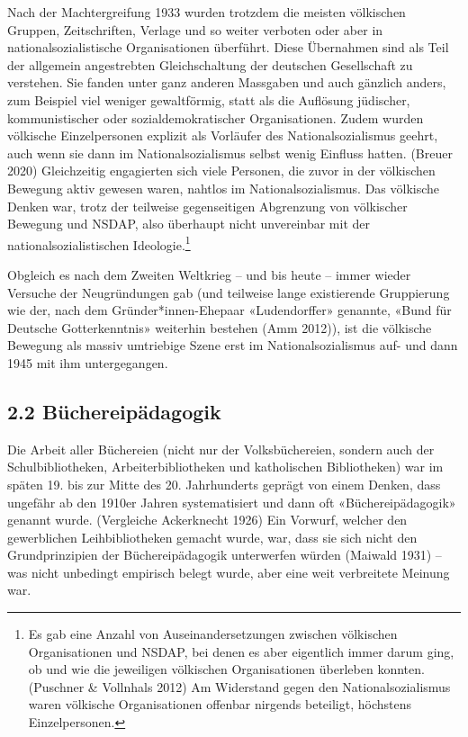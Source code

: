 \documentclass[a4paper,
fontsize=11pt,
oneside,
numbers=noperiodatend,
parskip=half-,
bibliography=totoc,
final
]{scrartcl}
\begin{document}
Nach der Machtergreifung 1933 wurden trotzdem die meisten völkischen
Gruppen, Zeitschriften, Verlage und so weiter verboten oder aber in
nationalsozialistische Organisationen überführt. Diese Übernahmen sind
als Teil der allgemein angestrebten Gleichschaltung der deutschen
Gesellschaft zu verstehen. Sie fanden unter ganz anderen Massgaben und
auch gänzlich anders, zum Beispiel viel weniger gewaltförmig, statt als
die Auflösung jüdischer, kommunistischer oder sozialdemokratischer
Organisationen. Zudem wurden völkische Einzelpersonen explizit als
Vorläufer des Nationalsozialismus geehrt, auch wenn sie dann im
Nationalsozialismus selbst wenig Einfluss hatten. (Breuer 2020)
Gleichzeitig engagierten sich viele Personen, die zuvor in der
völkischen Bewegung aktiv gewesen waren, nahtlos im Nationalsozialismus.
Das völkische Denken war, trotz der teilweise gegenseitigen Abgrenzung
von völkischer Bewegung und NSDAP, also überhaupt nicht unvereinbar mit
der nationalsozialistischen Ideologie.\footnote{Es gab eine Anzahl von
  Auseinandersetzungen zwischen völkischen Organisationen und NSDAP, bei
  denen es aber eigentlich immer darum ging, ob und wie die jeweiligen
  völkischen Organisationen überleben konnten. (Puschner \& Vollnhals
  2012) Am Widerstand gegen den Nationalsozialismus waren völkische
  Organisationen offenbar nirgends beteiligt, höchstens Einzelpersonen.}

Obgleich es nach dem Zweiten Weltkrieg -- und bis heute -- immer wieder
Versuche der Neugründungen gab (und teilweise lange existierende
Gruppierung wie der, nach dem Gründer*innen-Ehepaar «Ludendorffer»
genannte, «Bund für Deutsche Gotterkenntnis» weiterhin bestehen (Amm
2012)), ist die völkische Bewegung als massiv umtriebige Szene erst im
Nationalsozialismus auf- und dann 1945 mit ihm untergegangen.

\hypertarget{buxfcchereipuxe4dagogik}{%
\subsection{2.2 Büchereipädagogik}\label{buxfcchereipuxe4dagogik}}

Die Arbeit aller Büchereien (nicht nur der Volksbüchereien, sondern auch
der Schulbibliotheken, Arbeiterbibliotheken und katholischen
Bibliotheken) war im späten 19. bis zur Mitte des 20. Jahrhunderts
geprägt von einem Denken, dass ungefähr ab den 1910er Jahren
systematisiert und dann oft «Büchereipädagogik» genannt wurde.
(Vergleiche Ackerknecht 1926) Ein Vorwurf, welcher den gewerblichen
Leihbibliotheken gemacht wurde, war, dass sie sich nicht den
Grundprinzipien der Büchereipädagogik unterwerfen würden (Maiwald 1931)
-- was nicht unbedingt empirisch belegt wurde, aber eine weit
verbreitete Meinung war.
\end{document}
